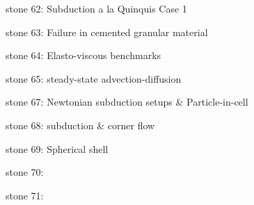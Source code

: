 {\noindent stone 62: Subduction a la Quinquis Case 1


\noindent stone 63: Failure in cemented granular material


\noindent stone 64: Elasto-viscous benchmarks 


\noindent stone 65: steady-state advection-diffusion


\noindent stone 67: Newtonian subduction setups \& Particle-in-cell


\noindent stone 68: subduction \& corner flow


\noindent stone 69: Spherical shell 


\noindent stone 70:


\noindent stone 71:




}









